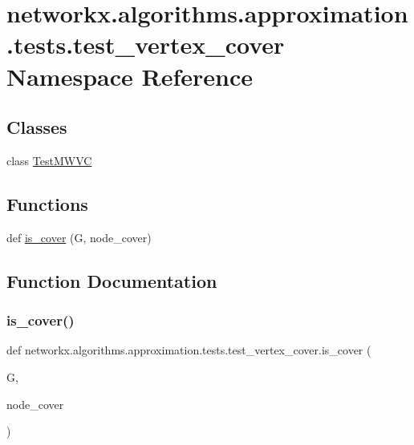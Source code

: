 \hypertarget{namespacenetworkx_1_1algorithms_1_1approximation_1_1tests_1_1test__vertex__cover}{}\section{networkx.\+algorithms.\+approximation.\+tests.\+test\+\_\+vertex\+\_\+cover Namespace Reference}
\label{namespacenetworkx_1_1algorithms_1_1approximation_1_1tests_1_1test__vertex__cover}
\subsection*{Classes}
\begin{DoxyCompactItemize}
\item 
class \hyperlink{classnetworkx_1_1algorithms_1_1approximation_1_1tests_1_1test__vertex__cover_1_1TestMWVC}{Test\+M\+W\+VC}
\end{DoxyCompactItemize}
\subsection*{Functions}
\begin{DoxyCompactItemize}
\item 
def \hyperlink{namespacenetworkx_1_1algorithms_1_1approximation_1_1tests_1_1test__vertex__cover_acc5b4f55b4bf184a4eddd60af6800951}{is\+\_\+cover} (G, node\+\_\+cover)
\end{DoxyCompactItemize}


\subsection{Function Documentation}
\mbox{\label{namespacenetworkx_1_1algorithms_1_1approximation_1_1tests_1_1test__vertex__cover_acc5b4f55b4bf184a4eddd60af6800951}} 
\subsubsection{\texorpdfstring{is\+\_\+cover()}{is\_cover()}}
{\footnotesize\ttfamily def networkx.\+algorithms.\+approximation.\+tests.\+test\+\_\+vertex\+\_\+cover.\+is\+\_\+cover (\begin{DoxyParamCaption}\item[{}]{G,  }\item[{}]{node\+\_\+cover }\end{DoxyParamCaption})}

